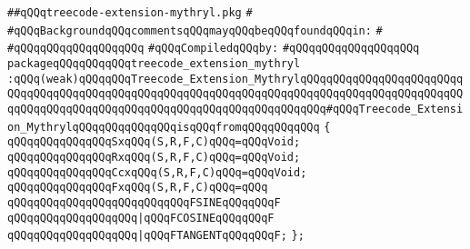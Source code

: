 \label{src/lib/compiler/back/low/main/nextcode/treecode-extension-mythryl.pkg}
\verb|##qQQqtreecode-extension-mythryl.pkg|\newline
\verb|#|\newline
\verb|#qQQqBackgroundqQQqcommentsqQQqmayqQQqbeqQQqfoundqQQqin:|\newline
\verb|#|\newline
\verb|#qQQqqQQqqQQqqQQqqQQq|\newline
\newline
\verb|#qQQqCompiledqQQqby:|\newline
\verb|#qQQqqQQqqQQqqQQqqQQq|\newline
\newline
\verb|packageqQQqqQQqqQQqtreecode_extension_mythryl|\newline
\verb|:qQQq(weak)qQQqqQQqTreecode_Extension_MythrylqQQqqQQqqQQqqQQqqQQqqQQqqQQqqQQqqQQqqQQqqQQqqQQqqQQqqQQqqQQqqQQqqQQqqQQqqQQqqQQqqQQqqQQqqQQqqQQqqQQqqQQqqQQqqQQqqQQqqQQqqQQqqQQqqQQqqQQqqQQqqQQq#qQQqTreecode_Extension_MythrylqQQqqQQqqQQqqQQqisqQQqfromqQQqqQQqqQQq|\newline
\verb|{|\newline
\verb|qQQqqQQqqQQqqQQqSxqQQq(S,R,F,C)qQQq=qQQqVoid;|\newline
\verb|qQQqqQQqqQQqqQQqRxqQQq(S,R,F,C)qQQq=qQQqVoid;|\newline
\verb|qQQqqQQqqQQqqQQqCcxqQQq(S,R,F,C)qQQq=qQQqVoid;|\newline
\verb|qQQqqQQqqQQqqQQqFxqQQq(S,R,F,C)qQQq=qQQq|\newline
\verb|qQQqqQQqqQQqqQQqqQQqqQQqqQQqFSINEqQQqqQQqF|\newline
\verb|qQQqqQQqqQQqqQQqqQQq|\verb#|qQQqFCOSINEqQQqqQQqF#\newline
\verb|qQQqqQQqqQQqqQQqqQQq|\verb#|qQQqFTANGENTqQQqqQQqF;#\newline
\newline
\verb|};|\newline
\newline

